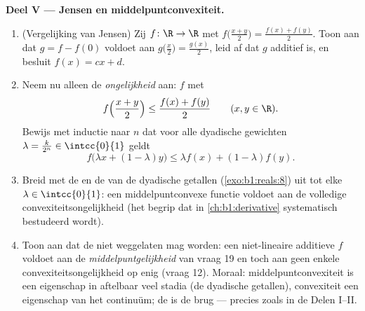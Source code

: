 \begin{problem}[{Weekendopgave --- $f(x + y) = f(x) + f(y)$: regelmaat
dwingt lineariteit af, en het portret van de monsters}]
\medskip
\noindent\textbf{Deel V --- Jensen en middelpuntconvexiteit.}
\begin{enumerate}[resume]
  \item (Vergelijking van Jensen) Zij $f \colon \R \to \R$  met
        $f\bigl(\frac{x+y}{2}\bigr) = \frac{f(x) + f(y)}{2}$. Toon aan
        dat $g = f - f(0)$ voldoet aan $g\bigl(\frac x2\bigr) =
        \frac{g(x)}{2}$, leid af dat $g$ additief is, en besluit $f(x) =
        cx + d$.
  \item Neem nu alleen de \emph{ongelijkheid} aan: $f$  met
        \[
        f\Bigl(\frac{x + y}{2}\Bigr) \leq \frac{f(x) +
        f(y)}{2} \qquad (x, y \in \R).
        \]
        Bewijs met inductie naar $n$ dat voor alle dyadische gewichten
        $\lambda = \frac{k}{2^n} \in \intcc{0}{1}$ geldt
        \[
        f\bigl(\lambda x + (1 - \lambda)y\bigr) \leq \lambda
        f(x) + (1 - \lambda) f(y) .
        \]
  \item Breid met de  en de  van de dyadische
        getallen (\cref{exo:b1:reals:8}) uit tot elke $\lambda \in
        \intcc{0}{1}$: een  middelpuntconvexe functie voldoet
        aan de volledige convexiteitsongelijkheid (het begrip dat in
        \cref{ch:b1:derivative} systematisch bestudeerd wordt).
  \item Toon aan dat de  niet weggelaten mag worden: een
        niet-lineaire additieve $f$ voldoet aan de
        \emph{middelpuntgelijkheid} van vraag 19 en toch aan geen enkele
        convexiteitsongelijkheid op enig  (vraag 12). Moraal:
        middelpuntconvexiteit is een eigenschap in aftelbaar veel stadia
        (de dyadische getallen), convexiteit een eigenschap van het
        continuüm; de  is de brug --- precies zoals in de
        Delen I--II.
\end{enumerate}


\end{problem}
